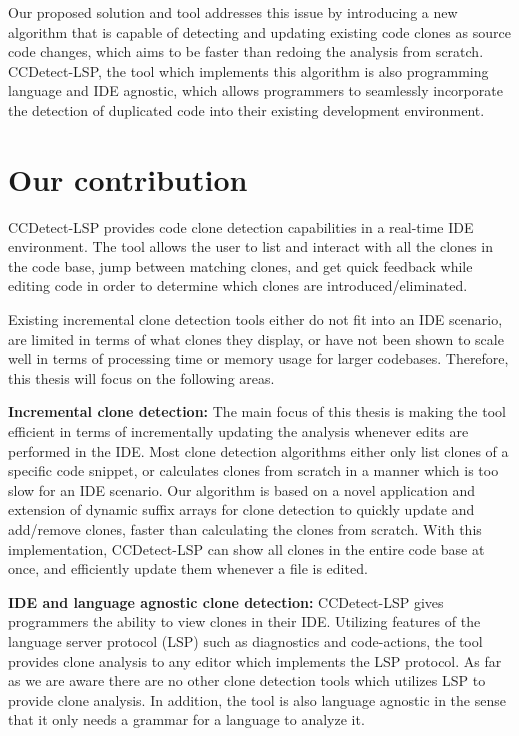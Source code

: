 Our proposed solution and tool addresses this issue by introducing a new algorithm that is
capable of detecting and updating existing code clones as source code changes, which aims
to be faster than redoing the analysis from scratch. CCDetect-LSP, the tool which
implements this algorithm is also programming language and IDE agnostic, which allows
programmers to seamlessly incorporate the detection of duplicated code into their existing
development environment.

\section{Our contribution}

CCDetect-LSP provides code clone detection capabilities in a real-time IDE environment.
The tool allows the user to list and interact with all the clones in the code base, jump
between matching clones, and get quick feedback while editing code in order to determine
which clones are introduced/eliminated.

Existing incremental clone detection tools either do not fit into an IDE scenario, are
limited in terms of what clones they display, or have not been shown to scale well in
terms of processing time or memory usage for larger codebases. Therefore, this thesis will
focus on the following areas.

\textbf{Incremental clone detection:} The main focus of this thesis is making the tool
efficient in terms of incrementally updating the analysis whenever edits are performed in
the IDE. Most clone detection algorithms either only list clones of a specific code
snippet, or calculates clones from scratch in a manner which is too slow for an IDE
scenario. Our algorithm is based on a novel application and extension of dynamic suffix
arrays for clone detection to quickly update and add/remove clones, faster than calculating the clones from
scratch. With this implementation, CCDetect-LSP can show all clones in the entire code
base at once, and efficiently update them whenever a file is edited.

\textbf{IDE and language agnostic clone detection:} CCDetect-LSP gives programmers the
ability to view clones in their IDE. Utilizing features of the language server protocol
(LSP) such as diagnostics and code-actions, the tool provides clone analysis to any editor
which implements the LSP protocol. As far as we are aware there are no other clone
detection tools which utilizes LSP to provide clone analysis. In addition, the tool is
also language agnostic in the sense that it only needs a grammar for a language to analyze
it.

